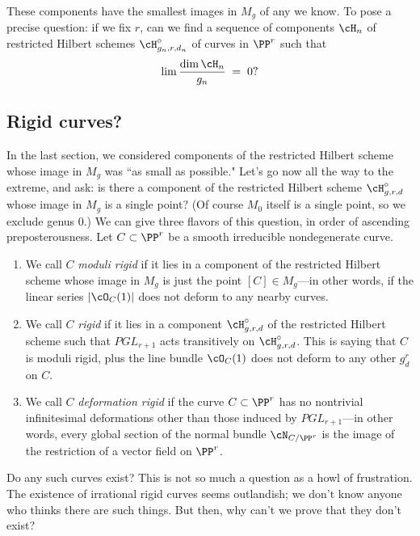These components have the smallest images in $M_{g}$ of any we know. To pose a precise question: if we fix $r$, can we find a sequence of components $\cH_n$ of  restricted Hilbert schemes  $\cH^\circ_{g_n,r,d_n}$ of curves in $\PP^r$ such that
$$
\lim \frac{\dim \cH_n}{g_n} \; = \; 0?
$$

\subsection{Rigid curves?}\label{rigid?}

In the last section, we considered components of the restricted Hilbert scheme whose image in $M_g$ was ``as small as possible." Let's go now all the way to the extreme, and ask: is there a component of the restricted Hilbert scheme $\cH^\circ_{g,r,d}$ whose image in $M_g$ is a single point? (Of course $M_0$ itself is a single point, so we exclude genus 0.) We can give three flavors of this question, in order of ascending preposterousness. Let $C \subset \PP^r$ be
a smooth irreducible nondegenerate curve.

\begin{enumerate} 
\item We call $C$ \emph{moduli rigid} if it lies in a component of the restricted Hilbert scheme whose image in $M_g$ is just the point $[C] \in M_g$---in other words, if the linear series $|\cO_C(1)|$ does not deform to any nearby curves.


\item We call $C$ \emph{rigid} if it lies in a component $\cH^\circ_{g,r,d}$ of the restricted Hilbert scheme such that $PGL_{r+1}$ acts transitively on $\cH^\circ_{g,r,d}$. This is saying that $C$ is moduli rigid, plus the line bundle $\cO_C(1)$ does not deform to any other $g^r_d$ on $C$.

\item We call $C$ \emph{deformation rigid} if the curve $C \subset \PP^r$ has no nontrivial infinitesimal deformations other than those induced by $PGL_{r+1}$---in other words, every global section of the normal bundle $\cN_{C/\PP^r}$ is the image of the restriction of a vector field on $\PP^r$.
\end{enumerate}

Do any such curves exist? This is not so much a question  as a howl of frustration. The existence of irrational rigid curves seems outlandish; we don't know anyone who thinks there are such things. But then, why can't we prove that they don't exist?



